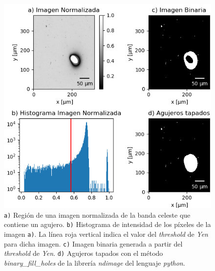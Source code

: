 \begin{figure}[H]
\centering
\includegraphics[scale=1.5]{Figs/defectosZEISS/algor_defecs.png}
\caption{\texttt{a)} Región de una imagen normalizada de la banda celeste que contiene un agujero. \texttt{b)} Histograma de intensidad de los píxeles de la imagen \texttt{a)}. La línea roja vertical indica el valor del \textit{threshold} de \textit{Yen} para dicha imagen. \texttt{c)} Imagen binaria generada a partir del \textit{threshold} de \textit{Yen}. \texttt{d)} Agujeros tapados con el método \textit{binary\_fill\_holes} de la librería \textit{ndimage} del lenguaje \textit{python}.}
\label{fig:flujoalgo}
\end{figure} 

